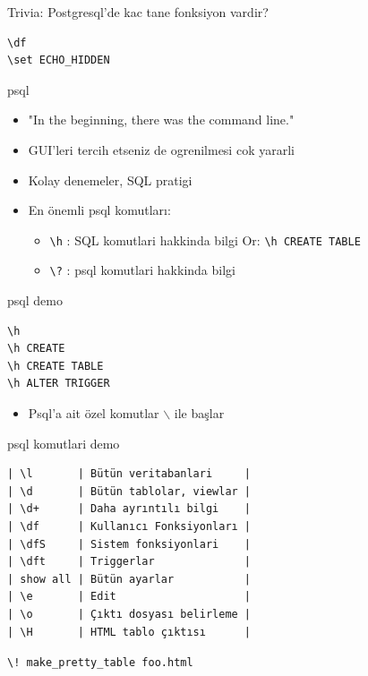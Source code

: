 \documentclass[presentation]{beamer}
\begin{document}
\begin{frame}[fragile,label=sec-8]{Trivia: Postgresql'de kac tane fonksiyon vardir?}
 \begin{verbatim}
\df
\set ECHO_HIDDEN
\end{verbatim}
\end{frame}

\begin{frame}[fragile,label=sec-9]{psql}
 \begin{itemize}
\item "In the beginning, there was the command line."
\item GUI'leri tercih etseniz de ogrenilmesi cok yararli
\item Kolay denemeler, SQL pratigi
\item En önemli psql komutları:
\begin{itemize}
\item \texttt{\textbackslash{}h} : SQL komutlari hakkinda bilgi
Or: \texttt{\textbackslash{}h CREATE TABLE}
\item \texttt{\textbackslash{}?} : psql komutlari hakkinda bilgi
\end{itemize}
\end{itemize}
\end{frame}

\begin{frame}[fragile,label=sec-10]{psql demo}
 \begin{verbatim}
\h
\h CREATE
\h CREATE TABLE
\h ALTER TRIGGER
\end{verbatim}

\begin{itemize}
\item Psql'a ait özel komutlar $\backslash$ ile başlar
\end{itemize}
\end{frame}

\begin{frame}[fragile,label=sec-11]{psql komutlari demo}
 \begin{verbatim}
| \l       | Bütün veritabanlari     |
| \d       | Bütün tablolar, viewlar |
| \d+      | Daha ayrıntılı bilgi    |
| \df      | Kullanıcı Fonksiyonları |
| \dfS     | Sistem fonksiyonlari    |
| \dft     | Triggerlar              |
| show all | Bütün ayarlar           |
| \e       | Edit                    |
| \o       | Çıktı dosyası belirleme |
| \H       | HTML tablo çıktısı      |
\end{verbatim}


\texttt{\textbackslash{}!  make\_pretty\_table foo.html}
\end{frame}
\end{document}
